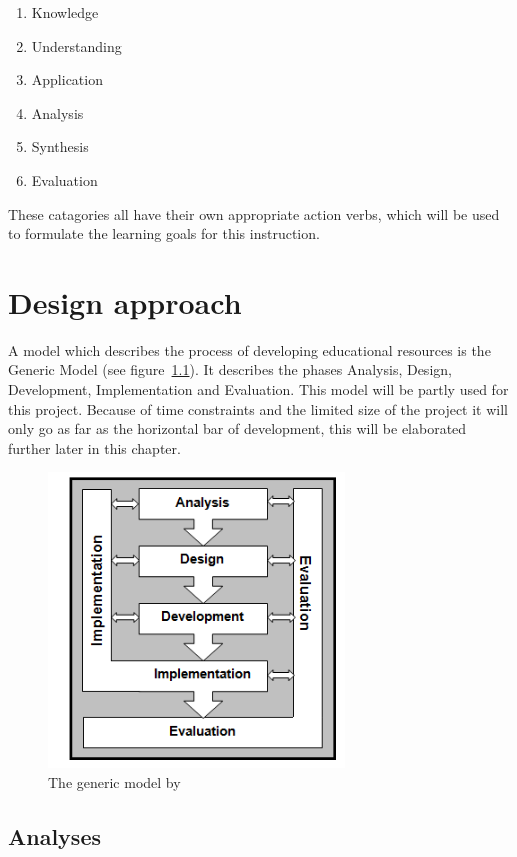 \documentclass[12pt]{report} %
\begin{document}
\begin{enumerate}
\item Knowledge
\item Understanding
\item Application
\item Analysis
\item Synthesis
\item Evaluation
\end{enumerate}

These catagories all have their own appropriate action verbs, which will be used to formulate the learning goals for this instruction.

\chapter{Design approach}

A model which describes the process of developing educational resources is the Generic Model \cite{genericmodel} (see figure~\ref{fig:genmod}). It describes the phases Analysis, Design, Development, Implementation and Evaluation. This model will be partly used for this project. Because of time constraints and the limited size of the project it will only go as far as the horizontal bar of development, this will be elaborated further later in this chapter.

\begin{figure}[h]
\centering
\includegraphics[width=0.7\textwidth]{genericmodel}
\caption{\footnotesize The generic model by \protect{}\label{fig:genmod}}
\end{figure}

\section{Analyses}
\end{document}

